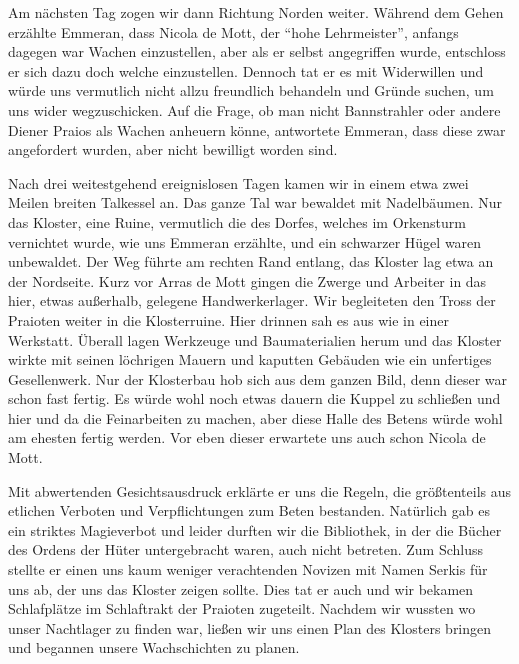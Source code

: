 Am nächsten Tag zogen wir dann Richtung Norden weiter. Während dem Gehen erzählte Emmeran, dass Nicola de Mott, der ``hohe Lehrmeister'', anfangs dagegen war Wachen einzustellen, aber als er selbst angegriffen wurde, entschloss er sich dazu doch welche einzustellen. Dennoch tat er es mit Widerwillen und würde uns vermutlich nicht allzu freundlich behandeln und Gründe suchen, um uns wider wegzuschicken. Auf die Frage, ob man nicht Bannstrahler oder andere Diener Praios als Wachen anheuern könne, antwortete Emmeran, dass diese zwar angefordert wurden, aber nicht bewilligt worden sind. 


Nach drei weitestgehend ereignislosen Tagen kamen wir in einem etwa zwei Meilen breiten Talkessel an. Das ganze Tal war bewaldet mit Nadelbäumen. Nur das Kloster, eine Ruine, vermutlich die des Dorfes, welches im Orkensturm vernichtet wurde, wie uns Emmeran erzählte, und ein schwarzer Hügel waren unbewaldet. Der Weg führte am rechten Rand entlang, das Kloster lag etwa an der Nordseite. Kurz vor Arras de Mott gingen die Zwerge und Arbeiter in das hier, etwas außerhalb, gelegene Handwerkerlager. Wir begleiteten den Tross der Praioten weiter in die Klosterruine. Hier drinnen sah es aus wie in einer Werkstatt. Überall lagen Werkzeuge und Baumaterialien herum und das Kloster wirkte mit seinen löchrigen Mauern und kaputten Gebäuden wie ein unfertiges Gesellenwerk. Nur der Klosterbau hob sich aus dem ganzen Bild, denn dieser war schon fast fertig. Es würde wohl noch etwas dauern die Kuppel zu schließen und hier und da die Feinarbeiten zu machen, aber diese Halle des Betens würde wohl am ehesten fertig werden. Vor eben dieser erwartete uns auch schon Nicola de Mott. 


Mit abwertenden Gesichtsausdruck erklärte er uns die Regeln, die größtenteils aus etlichen Verboten und Verpflichtungen zum Beten bestanden. Natürlich gab es ein striktes Magieverbot und leider durften wir die Bibliothek, in der die Bücher des Ordens der Hüter untergebracht waren, auch nicht betreten. Zum Schluss stellte er einen uns kaum weniger verachtenden Novizen mit Namen Serkis für uns ab, der uns das Kloster zeigen sollte. Dies tat er auch und wir bekamen Schlafplätze im Schlaftrakt der Praioten zugeteilt. Nachdem wir wussten wo unser Nachtlager zu finden war, ließen wir uns einen Plan des Klosters bringen und begannen unsere Wachschichten zu planen. 


